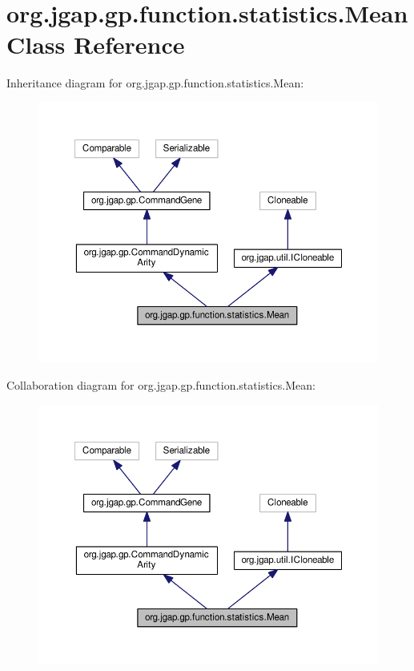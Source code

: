 \hypertarget{classorg_1_1jgap_1_1gp_1_1function_1_1statistics_1_1_mean}{\section{org.\-jgap.\-gp.\-function.\-statistics.\-Mean Class Reference}
\label{classorg_1_1jgap_1_1gp_1_1function_1_1statistics_1_1_mean}
}


Inheritance diagram for org.\-jgap.\-gp.\-function.\-statistics.\-Mean\-:
\nopagebreak
\begin{figure}[H]
\begin{center}
\leavevmode
\includegraphics[width=350pt]{classorg_1_1jgap_1_1gp_1_1function_1_1statistics_1_1_mean__inherit__graph}
\end{center}
\end{figure}


Collaboration diagram for org.\-jgap.\-gp.\-function.\-statistics.\-Mean\-:
\nopagebreak
\begin{figure}[H]
\begin{center}
\leavevmode
\includegraphics[width=350pt]{classorg_1_1jgap_1_1gp_1_1function_1_1statistics_1_1_mean__coll__graph}
\end{center}
\end{figure}
